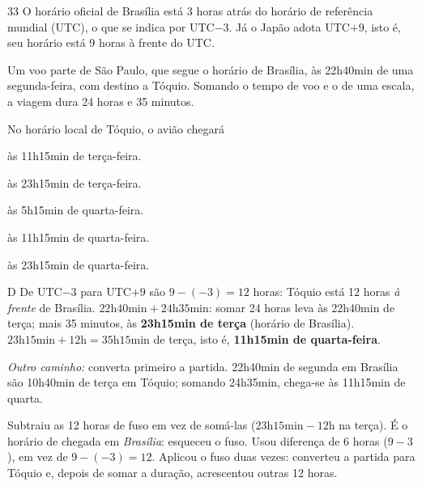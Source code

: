 \begin{questaoinedita}{3}{3}
O horário oficial de Brasília está 3 horas atrás do horário de referência mundial (UTC), o que se
indica por UTC$-3$. Já o Japão adota UTC$+9$, isto é, seu horário está 9 horas à frente do UTC.

Um voo parte de São Paulo, que segue o horário de Brasília, às 22h40min de uma segunda-feira, com
destino a Tóquio. Somando o tempo de voo e o de uma escala, a viagem dura 24 horas e 35 minutos.

No horário local de Tóquio, o avião chegará
\begin{alternativas}
\item às 11h15min de terça-feira.
\item às 23h15min de terça-feira.
\item às 5h15min de quarta-feira.
\item às 11h15min de quarta-feira.
\item às 23h15min de quarta-feira.
\end{alternativas}
\end{questaoinedita}
\begin{resolucao}{D}
 De UTC$-3$ para UTC$+9$ são $9-(-3)=12$ horas: Tóquio está 12 horas
\emph{à frente} de Brasília.
 $22\text{h}40\text{min}+24\text{h}35\text{min}$: somar
24 horas leva às 22h40min de terça; mais 35 minutos, às \textbf{23h15min de terça} (horário de Brasília).
 $23\text{h}15\text{min}+12\text{h}=35\text{h}15\text{min}$ de
terça, isto é, \textbf{11h15min de quarta-feira}.

\emph{Outro caminho:} converta primeiro a partida. 22h40min de segunda em Brasília são 10h40min de
terça em Tóquio; somando 24h35min, chega-se às 11h15min de quarta.
\begin{distratores}
 Subtraiu as 12 horas de fuso em vez de somá-las ($23\text{h}15\text{min}-12\text{h}$ na terça).
 É o horário de chegada em \emph{Brasília}: esqueceu o fuso.
 Usou diferença de 6 horas ($9-3$), em vez de $9-(-3)=12$.
 Aplicou o fuso duas vezes: converteu a partida para Tóquio e, depois de somar a duração,
acrescentou outras 12 horas.
\end{distratores}
\end{resolucao}

